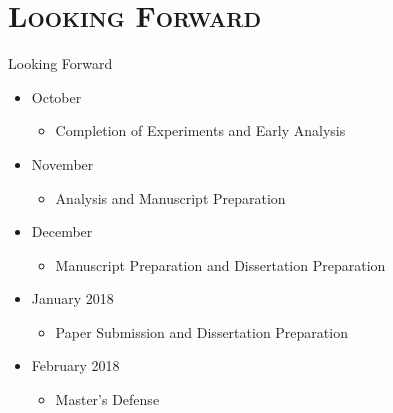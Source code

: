 \documentclass[xcolor=x11names,compress]{beamer}
\renewcommand{\(}{\begin{columns}}
\renewcommand{\)}{\end{columns}}
\newcommand{\<}[1]{\begin{column}{#1}}
\renewcommand{\>}{\end{column}}
\begin{document}
\section{\scshape Looking Forward}
\begin{frame}{Looking Forward}
\begin{itemize}
	\item October
		\begin{itemize}
			\item Completion of Experiments and Early Analysis 
		\end{itemize}
	\item November
		\begin{itemize}
			\item Analysis and Manuscript Preparation
		\end{itemize}
	\item December
		\begin{itemize}
			\item Manuscript Preparation and Dissertation Preparation
		\end{itemize}
	\item January 2018
		\begin{itemize}
			\item Paper Submission and Dissertation Preparation
		\end{itemize}
	\item February 2018
		\begin{itemize}
			\item Master's Defense
		\end{itemize}
\end{itemize}

\end{frame}


\end{document}
